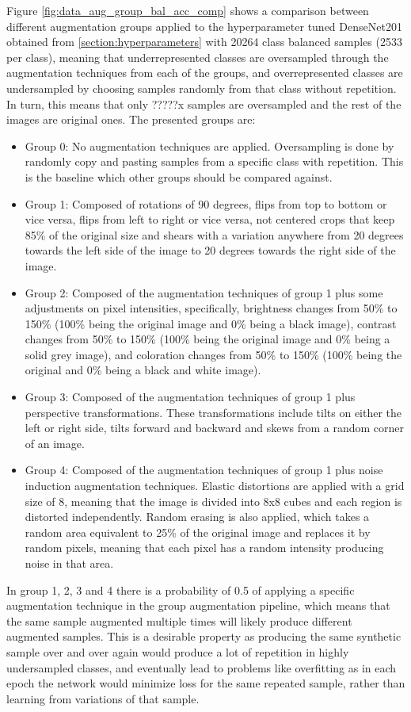     Figure \ref{fig:data_aug_group_bal_acc_comp} shows a comparison between different augmentation groups applied to the hyperparameter tuned DenseNet201 obtained from \autoref{section:hyperparameters} with 20264 class balanced samples (2533 per class), meaning that underrepresented classes are oversampled through the augmentation techniques from each of the groups, and overrepresented classes are undersampled by choosing samples randomly from that class without repetition. In turn, this means that only ?????x samples are oversampled and the rest of the images are original ones. The presented groups are:
    \begin{itemize}
        \item Group 0: No augmentation techniques are applied. Oversampling is done by randomly copy and pasting samples from a specific class with repetition. This is the baseline which other groups should be compared against.
        \item Group 1: Composed of rotations of 90 degrees, flips from top to bottom or vice versa, flips from left to right or vice versa, not centered crops that keep 85\% of the original size and shears with a variation anywhere from 20 degrees towards the left side of the image to 20 degrees towards the right side of the image. 
        \item Group 2: Composed of the augmentation techniques of group 1 plus some adjustments on pixel intensities, specifically, brightness changes from 50\% to 150\% (100\% being the original image and 0\% being a black image), contrast changes from 50\% to 150\% (100\% being the original image and 0\% being a solid grey image), and coloration changes from 50\% to 150\% (100\% being the original and 0\% being a black and white image).
        \item Group 3: Composed of the augmentation techniques of group 1 plus perspective transformations. These transformations include tilts on either the left or right side, tilts forward and backward and skews from a random corner of an image.
        \item Group 4: Composed of the augmentation techniques of group 1 plus noise induction augmentation techniques. Elastic distortions are applied with a grid size of 8, meaning that the image is divided into 8x8 cubes and each region is distorted independently. Random erasing is also applied, which takes a random area equivalent to 25\% of the original image and replaces it by random pixels, meaning that each pixel has a random intensity producing noise in that area.
    \end{itemize}
    In group 1, 2, 3 and 4 there is a probability of 0.5 of applying a specific augmentation technique in the group augmentation pipeline, which means that the same sample augmented multiple times will likely produce different augmented samples. This is a desirable property as producing the same synthetic sample over and over again would produce a lot of repetition in highly undersampled classes, and eventually lead to problems like overfitting as in each epoch the network would minimize loss for the same repeated sample, rather than learning from variations of that sample. \par
    
